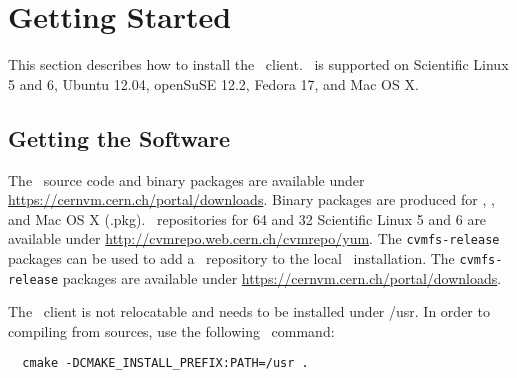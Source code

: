 \chapter{Getting Started}
\label{sct:start}

This section describes how to install the \cvmfs\ client.
\cvmfs\ is supported on Scientific Linux 5 and 6, Ubuntu 12.04, openSuSE 12.2, Fedora 17, and Mac OS X.

\section{Getting the Software}
The \cvmfs\ source code and binary packages are available under \url{https://cernvm.cern.ch/portal/downloads}.
Binary packages are produced for \rpm, \dpkg, and Mac OS X (.pkg).
\yum\ repositories for \SI{64}{\bit} and \SI{32}{\bit} Scientific Linux 5 and 6 are available under \url{http://cvmrepo.web.cern.ch/cvmrepo/yum}.
The \texttt{cvmfs-release} packages can be used to add a \cvmfs\ repository to the local \yum\ installation.
The \texttt{cvmfs-release} packages are available under \url{https://cernvm.cern.ch/portal/downloads}.

The \cvmfs\ client is not relocatable and needs to be installed under /usr.
In order to compiling from sources, use the following \cmake\ command:
\begin{verbatim}
  cmake -DCMAKE_INSTALL_PREFIX:PATH=/usr .
\end{verbatim}


